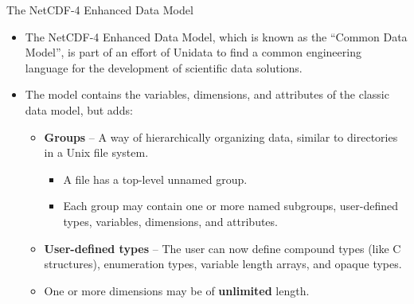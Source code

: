 \documentclass[compress,11pt,xcolor=svgnames,aspectratio=169]{beamer}
\begin{document}
\begin{frame}[fragile]{The NetCDF-4 Enhanced Data Model}

\begin{itemize}
\setlength\itemsep{0.2cm}

    \item The NetCDF-4 Enhanced Data Model, which is known as the ``Common Data Model'', is part of an effort of Unidata to find a common engineering language for the development of scientific data solutions.

    \item The model contains the variables, dimensions, and attributes of the classic data model, but adds:\\[0.2cm]

    \begin{itemize}
    \setlength\itemsep{0.2cm}

        \item \textbf{Groups} -- A way of hierarchically organizing data, similar to directories in a Unix file system.\\[0.2cm]

        \begin{itemize}
        \setlength\itemsep{0.1cm}
            \item A file has a top-level unnamed group.
            \item Each group may contain one or more named subgroups, user-defined types, variables, dimensions, and attributes.
        \end{itemize}

        \item \textbf{User-defined types} -- The user can now define compound types (like C structures), enumeration types, variable length arrays, and opaque types.

        \item One or more dimensions may be of \textbf{unlimited} length.

    \end{itemize}

\end{itemize}

\nocite{netcdf}

\end{frame}
\end{document}

